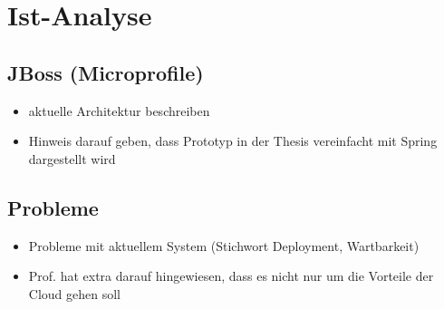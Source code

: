 \chapter{Ist-Analyse}

\section{JBoss (Microprofile)}
\begin{itemize}
  \item aktuelle Architektur beschreiben
  \item Hinweis darauf geben, dass Prototyp in der Thesis vereinfacht mit Spring dargestellt wird
\end{itemize}

\section{Probleme}
\begin{itemize}
  \item Probleme mit aktuellem System (Stichwort Deployment, Wartbarkeit)
  \item Prof. hat extra darauf hingewiesen, dass es nicht nur um die Vorteile der Cloud gehen soll
\end{itemize}
